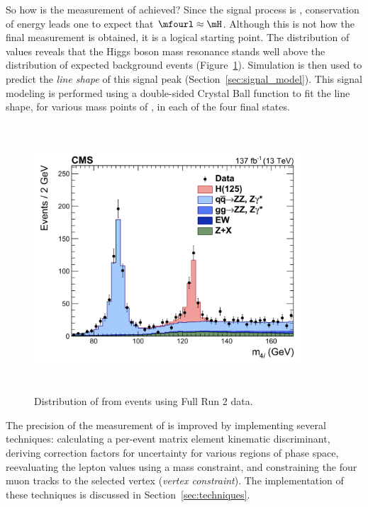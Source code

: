 So how is the measurement of \mH achieved?
Since the signal process is \hzzfourl, conservation of energy leads one to expect that $\mfourl \approx \mH$.
Although this is not how the final measurement is obtained, it is a logical starting point.
The distribution of \mfourl values reveals that the Higgs boson mass resonance stands well above the distribution of expected background events (Figure~\ref{fig:m4l_run2}).
Simulation is then used to predict the \emph{line shape} of this signal peak (Section~\ref{sec:signal_model}).
This signal modeling is performed using a double-sided Crystal Ball function to fit the line shape, for various mass points of \mH, in each of the four final states.
\begin{figure}[pbth]
    \centering
    \includegraphics[width=10cm,height=10cm,keepaspectratio]{figures/higgsmassmeas/m4l_FullRun2_epjc.jpeg}
        \caption{Distribution of \mfourl from \hzzfourl events using Full Run 2 data.}
        \label{fig:m4l_run2}
\end{figure}

The precision of the measurement of \mH is improved by implementing several techniques:
calculating a per-event matrix element kinematic discriminant,
deriving correction factors for \mfourl uncertainty for various regions of phase space,
reevaluating the lepton \pt values using a \Zone mass constraint,
and constraining the four muon tracks to the selected vertex (\emph{vertex constraint}).
The implementation of these techniques is discussed in Section~\ref{sec:techniques}.

